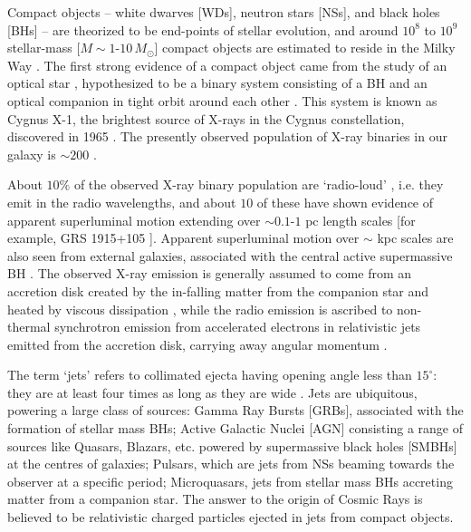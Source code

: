 \newcommand{\R}{\textbf{(ref)}}
\newcommand{\Rlots}{\textbf{(lots of ref)}}


Compact objects -- white dwarves [WDs], neutron stars [NSs], and black holes [BHs] -- are theorized to be end-points of stellar evolution, and around $10^{8}$ to $10^{9}$ stellar-mass [$ M \sim 1 $-$ 10 \, M_{\odot} $] compact objects are estimated to reside in the Milky Way \citep{Timmes_et_al.-1996-ApJ}. The first strong evidence of a compact object came from the study of an optical star \citep{Webster_&_Murdin-1972-Nature}, hypothesized to be a binary system consisting of a BH and an optical companion in tight orbit around each other \citep{Bolton-1972-Nature-Identification}. This system is known as Cygnus X-1, the brightest source of X-rays in the Cygnus constellation, discovered in 1965 \citep{Bowyer_et_al.-1965}. The presently observed population of X-ray binaries in our galaxy is $\sim 200$ \citep{vanParadijs-1995-Catalogue}.

About $10 \%$ of the observed X-ray binary population are `radio-loud' \citep{Hjellming_&_Han-1995-H&H_Catalogue}, i.e. they emit in the radio wavelengths, and about $10$ of these have shown evidence of apparent superluminal motion extending over $\sim 0.1$-$1$ pc length scales [for example, GRS 1915+105 \citep{Mirabel_&_Rodriguez-1994-Nature,Mirabel_&_Rodriguez-1999-ARAA}]. Apparent superluminal motion over $\sim$ kpc scales are also seen from external galaxies, associated with the central active supermassive BH \citep{Zensus-1997-ARAA}. The observed X-ray emission is generally assumed to come from an accretion disk created by the in-falling matter from the companion star and heated by viscous dissipation \citep{Shakura-1972,Shakura_&_Sunayev-1973-AAp,Pringle-1981-ARAA}, while the radio emission is ascribed to non-thermal synchrotron emission from accelerated electrons in relativistic jets emitted from the accretion disk, carrying away angular momentum \citep{Mirabel_&_Rodriguez-1998-Nature,Fender_et_al.-1999-ApJL,Dhawan_et_al.-2000-ApJ}.

The term `jets' refers to collimated ejecta having opening angle less than $15^{\circ}$: they are at least four times as long as they are wide \citep{Bridle_&_Perley-1984-ARAA}. Jets are ubiquitous, powering a large class of sources: Gamma Ray Bursts [GRBs], associated with the formation of stellar mass BHs; Active Galactic Nuclei [AGN] consisting a range of sources like Quasars, Blazars, etc. powered by supermassive black holes [SMBHs] at the centres of galaxies; Pulsars, which are jets from NSs beaming towards the observer at a specific period; Microquasars, jets from stellar mass BHs accreting matter from a companion star. The answer to the origin of Cosmic Rays is believed to be relativistic charged particles ejected in jets from compact objects.

